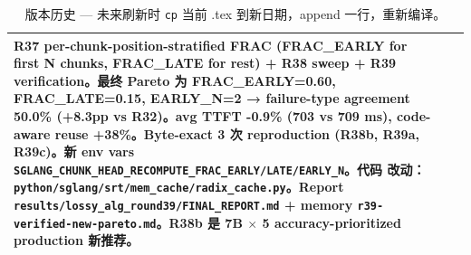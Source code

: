 \documentclass[11pt,a4paper]{article}
\begin{document}
\begin{table}[h]
\begin{tabular}{@{}lll@{}}
R37 per-chunk-position-stratified FRAC (FRAC\_EARLY for first N chunks,
FRAC\_LATE for rest) + R38 sweep + R39 verification。\textbf{最终 Pareto
为 FRAC\_EARLY=0.60, FRAC\_LATE=0.15, EARLY\_N=2 → failure-type agreement
50.0\% (+8.3pp vs R32)}。avg TTFT -0.9\% (703 vs 709 ms), code-aware
reuse +38\%。Byte-exact 3 次 reproduction (R38b, R39a, R39c)。新 env
vars \texttt{SGLANG\_CHUNK\_HEAD\_RECOMPUTE\_FRAC\_EARLY/LATE/EARLY\_N}。代码
改动：\texttt{python/sglang/srt/mem\_cache/radix\_cache.py}。Report
\texttt{results/lossy\_alg\_round39/FINAL\_REPORT.md} +
memory \texttt{r39-verified-new-pareto.md}。R38b 是 7B $\times$ 5
accuracy-prioritized production 新推荐。 \\
\bottomrule
\end{tabular}
\caption{版本历史 --- 未来刷新时 \texttt{cp} 当前 .tex 到新日期，append 一行，重新编译。}
\end{table}
\end{document}
